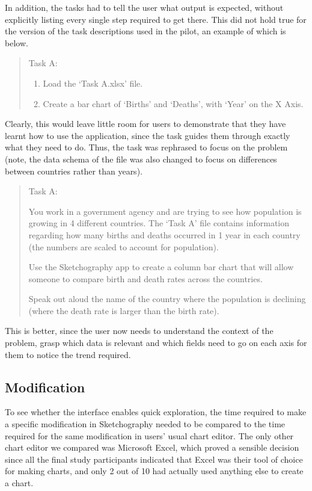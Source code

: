 In addition, the tasks had to tell the user what output is expected, without explicitly listing every single step required to get there. This did not hold true for the version of the task descriptions used in the pilot, an example of which is below.

\begin{quotation}
Task A:
\begin{enumerate}
\item Load the `Task A.xlsx' file.
\item Create a bar chart of `Births' and `Deaths', with `Year' on the X Axis.
\end{enumerate}
\end{quotation}

Clearly, this would leave little room for users to demonstrate that they have learnt how to use the application, since the task guides them through exactly what they need to do. Thus, the task was rephrased to focus on the problem (note, the data schema of the file was also changed to focus on differences between countries rather than years).

\begin{quotation}
Task A:

You work in a government agency and are trying to see how population is growing in 4 different countries. The ‘Task A’ file contains information regarding how many births and deaths occurred in 1 year in each country (the numbers are scaled to account for population). 

Use the Sketchography app to create a column bar chart that will allow someone to compare birth and death rates across the countries.

Speak out aloud the name of the country where the population is declining (where the death rate is larger than the birth rate).

\end{quotation}

This is better, since the user now needs to understand the context of the problem, grasp which data is relevant and which fields need to go on each axis for them to notice the trend required.

\subsection*{Modification}
To see whether the interface enables quick exploration, the time required to make a specific modification in Sketchography needed to be compared to the time required for the same modification in users' usual chart editor. The only other chart editor we compared was Microsoft Excel, which proved a sensible decision since all the final study participants indicated that Excel was their tool of choice for making charts, and only 2 out of 10 had actually used anything else to create a chart.

